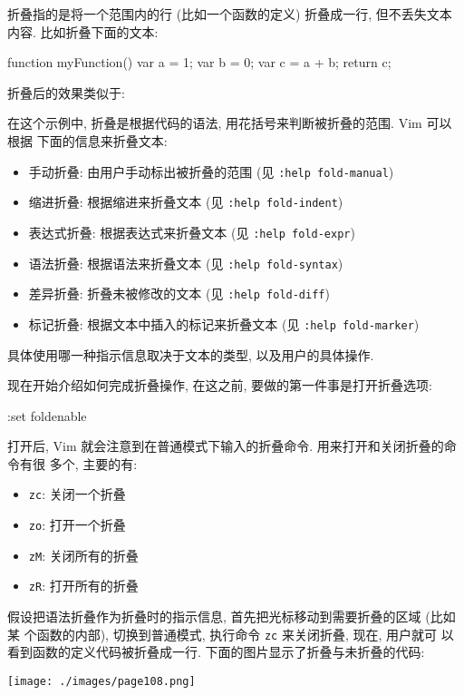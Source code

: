 折叠指的是将一个范围内的行 (比如一个函数的定义) 折叠成一行, 但不丢失文本内容.
比如折叠下面的文本:
\begin{vimcode}
function myFunction() {
    var a = 1;
    var b = 0;
    var c = a + b;
    return c;
}
\end{vimcode}
折叠后的效果类似于:
\begin{vimcode}
+-- 6 lines: function myFunction() {
\end{vimcode}
在这个示例中, 折叠是根据代码的语法, 用花括号来判断被折叠的范围. Vim 可以根据
下面的信息来折叠文本:
\begin{itemize}
    \item 手动折叠: 由用户手动标出被折叠的范围 (见 \texttt{:help fold-manual})
    \item 缩进折叠: 根据缩进来折叠文本 (见 \texttt{:help fold-indent})
    \item 表达式折叠: 根据表达式来折叠文本 (见 \texttt{:help fold-expr})
    \item 语法折叠: 根据语法来折叠文本 (见 \texttt{:help fold-syntax})
    \item 差异折叠: 折叠未被修改的文本 (见 \texttt{:help fold-diff})
    \item 标记折叠: 根据文本中插入的标记来折叠文本 (见
        \texttt{:help fold-marker})
\end{itemize}
具体使用哪一种指示信息取决于文本的类型, 以及用户的具体操作.

现在开始介绍如何完成折叠操作, 在这之前, 要做的第一件事是打开折叠选项:
\begin{vimcode}
:set foldenable
\end{vimcode}
打开后, Vim 就会注意到在普通模式下输入的折叠命令. 用来打开和关闭折叠的命令有很
多个, 主要的有:
\begin{itemize}
    \item \texttt{zc}: 关闭一个折叠
    \item \texttt{zo}: 打开一个折叠
    \item \texttt{zM}: 关闭所有的折叠
    \item \texttt{zR}: 打开所有的折叠
\end{itemize}
假设把语法折叠作为折叠时的指示信息, 首先把光标移动到需要折叠的区域 (比如某
个函数的内部), 切换到普通模式, 执行命令 \texttt{zc} 来关闭折叠, 现在, 用户就可
以看到函数的定义代码被折叠成一行. 下面的图片显示了折叠与未折叠的代码:
\begin{center}
\texttt{[image: ./images/page108.png]}
\end{center}

